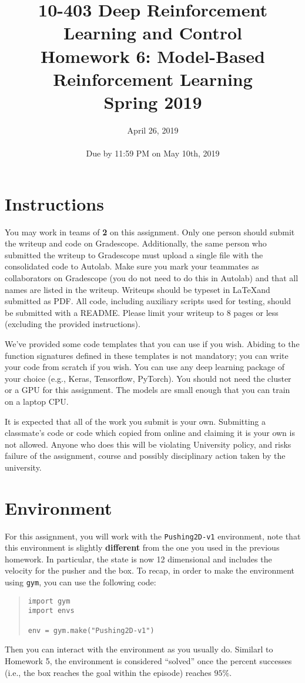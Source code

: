 \documentclass[12pt]{article}
\title{10-403 Deep Reinforcement Learning and Control\\
  Homework 6: Model-Based Reinforcement Learning\\
  Spring 2019\\
}
\date{April 26, 2019\\
  \hspace{1cm}\\
Due by 11:59 PM on May 10th, 2019}
\begin{document}
\maketitle
\noindent
\section*{Instructions}

You may work in teams of \textbf{2} on this assignment. Only one person should submit the writeup and code on Gradescope. Additionally, the same person who submitted the writeup to Gradescope must upload a single file with the consolidated code to Autolab.  Make sure you mark your teammates as collaborators on Gradescope (you do not need to do this in Autolab) and that all names are listed in the writeup.  Writeups should be typeset in \LaTeX and submitted as PDF. All code, including auxiliary scripts used for testing, should be submitted with a README.  Please limit your writeup to 8 pages or less (excluding the provided instructions).

We've provided some code templates that you can use if you wish. Abiding to the function signatures defined in these templates is not mandatory; you can write your code from scratch if you wish. You can use any deep learning package of your choice (e.g., Keras, Tensorflow, PyTorch). You should not need the cluster or a GPU for this assignment. The models are small enough that you can train on a laptop CPU.

It is expected that all of the work you submit is your own. Submitting a classmate's code or code which copied from online and claiming it is your own is not allowed. Anyone who does this will be violating University policy, and risks failure of the assignment, course and possibly disciplinary action taken by the university.

\section*{Environment}
For this assignment, you will work with the \texttt{Pushing2D-v1} environment, note that this environment is slightly \textbf{different} from the one you used in the previous homework.  In particular, the state is now 12 dimensional and includes the velocity for the pusher and the box.  To recap, in order to make the environment using \texttt{gym}, you can use the following code:
\begin{quote}
\begin{verbatim}
import gym
import envs

env = gym.make("Pushing2D-v1")
\end{verbatim}
\end{quote}
Then you can interact with the environment as you usually do.  Similarl to Homework 5, the environment is considered ``solved'' once the percent successes (i.e., the box reaches the goal within the episode) reaches $95\%$. 
\end{document}

